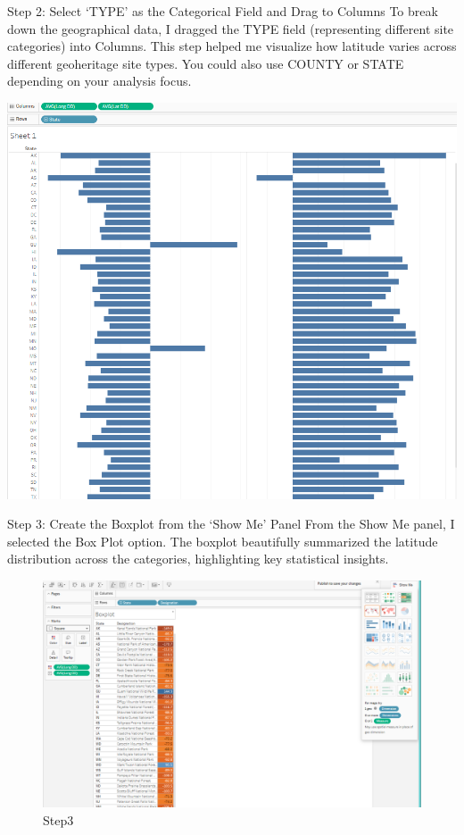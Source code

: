 \documentclass[
  letterpaper,
  DIV=11,
  numbers=noendperiod]{scrreprt}
\begin{document}
Step 2: Select `TYPE' as the Categorical Field and Drag to Columns To
break down the geographical data, I dragged the TYPE field (representing
different site categories) into Columns. This step helped me visualize
how latitude varies across different geoheritage site types. You could
also use COUNTY or STATE depending on your analysis focus.

\includegraphics{Step2_ACT.png}

Step 3: Create the Boxplot from the `Show Me' Panel From the Show Me
panel, I selected the Box Plot option. The boxplot beautifully
summarized the latitude distribution across the categories, highlighting
key statistical insights.

\begin{figure}[H]

{\centering \includegraphics{Step3_ACT.png}

}

\caption{Step3}

\end{figure}%
\end{document}
